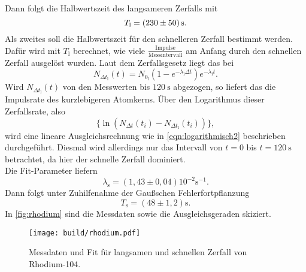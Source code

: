 \noindent Dann folgt die Halbwertszeit des langsameren Zerfalls mit
\begin{equation}
	T_\text{l} = \SI{230\pm50}{\second}.
\end{equation}
\noindent
Als zweites soll die Halbwertszeit für den schnelleren Zerfall bestimmt werden. Dafür wird mit
$T_\text{l}$ berechnet, wie viele $\frac{\text{Impulse}}{\text{Messintervall}}$ am Anfang durch den schnellen Zerfall ausgelöst wurden.
Laut dem Zerfallsgesetz liegt das bei
\begin{equation}
	N_{\Delta t_\text{l}} (t) = N_{0_\text{l}} \left(1 - e^{-\lambda_\text{l}\Delta t}\right) 
	e^{-\lambda_\text{l}t }.
\end{equation}
\noindent
Wird $N_{\Delta t_\text{l}}(t)$ von den Messwerten bis $\SI{120}{\second}$ abgezogen, so liefert das
die Impulsrate des kurzlebigeren Atomkerns. Über den Logarithmus dieser Zerfallsrate, also
\begin{equation}
	\{ \ln(N_{\Delta t}(t_i) - N_{\Delta t_\text{l}} (t_i)) \},
\end{equation}
wird eine lineare Ausgleichsrechnung wie in \autoref{eqn:logarithmisch2} beschrieben durchgeführt. Diesmal
wird allerdings nur das Intervall von $t=0$ bis $t=\SI{120}{\second}$ betrachtet, da hier der schnelle 
Zerfall dominiert.
\\
Die Fit-Parameter liefern
\begin{equation}
	\lambda_\text{s} = (1,43 \pm 0,04) 10^{-2} \si{\second}^{-1}.
\end{equation}
Dann folgt unter Zuhilfenahme der Gaußschen Fehlerfortpflanzung
\begin{equation}
	T_\text{s} = (48\pm1,2)\si{\second}.
\end{equation}
\noindent
In \autoref{fig:rhodium} sind die Messdaten sowie die Ausgleichsgeraden skiziert.
\begin{figure}[H]
	\centering
	\texttt{[image: build/rhodium.pdf]}
	\caption{Messdaten und Fit für langsamen und schnellen Zerfall von Rhodium-104.}
	\label{fig:rhodium}
\end{figure}
